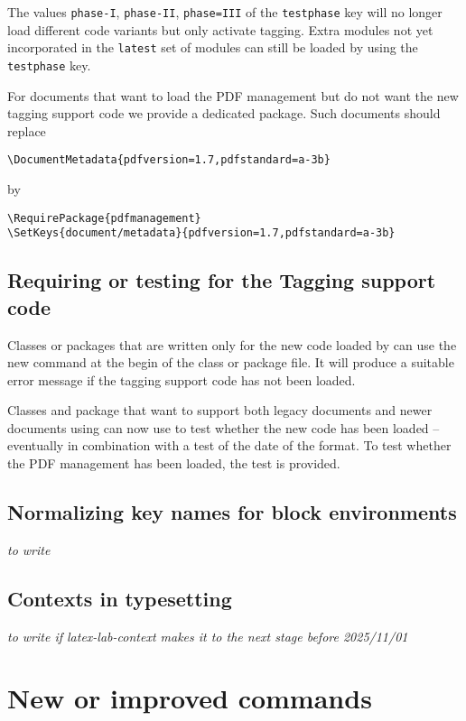 \documentclass{ltnews}
\begin{document}
The values \texttt{phase-I}, \texttt{phase-II}, \texttt{phase=III} of the 
\texttt{testphase} key will no longer load different code variants but only 
activate tagging. Extra modules not yet incorporated in the \texttt{latest} set of 
modules can still be loaded by using  the \texttt{testphase} key.
 
For documents that want to load the PDF management but do not want the new tagging support 
code we provide a dedicated package. Such documents should replace
\begin{verbatim}
\DocumentMetadata{pdfversion=1.7,pdfstandard=a-3b}
\end{verbatim}
by
\begin{verbatim}
\RequirePackage{pdfmanagement}
\SetKeys{document/metadata}{pdfversion=1.7,pdfstandard=a-3b}
\end{verbatim}

 
\subsection{Requiring or testing for the Tagging support code}
Classes or packages that are written only for the new code loaded by
 can use the new command  at the begin 
of the class or package file. It will produce a suitable error message if
the tagging support code has not been loaded.
 
Classes and package that want to support both legacy documents and newer documents 
using  can now use  to test whether the 
new code has been loaded -- eventually in combination with a test of the date of 
the format. To test whether the PDF management has been loaded, the test 
 is provided.
 

\subsection{Normalizing key names for block environments}

\emph{to write}


\subsection{Contexts in typesetting}

\emph{to write if latex-lab-context makes it to the next stage before 2025/11/01}


\section{New or improved commands}
\end{document}
